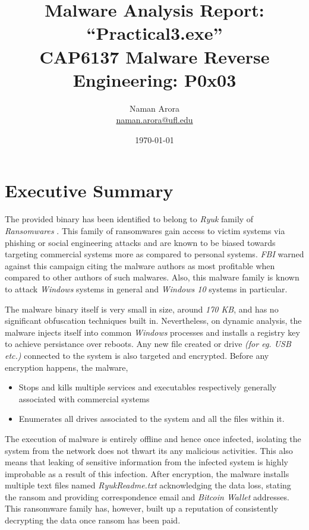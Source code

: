 \documentclass[10pt,a4paper]{article}
\begin{document}

\title{Malware Analysis Report: ``Practical3.exe''\\ \vspace{-8pt} {\large CAP6137 Malware Reverse Engineering: P0x03}}
\author{{Naman Arora \\ \vspace{-10pt}\small \href{mailto:naman.arora@ufl.edu}{naman.arora@ufl.edu}}}
\date{\today}

\maketitle
\newpage
\tableofcontents
\newpage
\section{Executive Summary}
The provided binary has been identified to belong to \textit{Ryuk} family of \textit{Ransomwares} \cite{ransomware}.
This family of ransomwares gain access to victim systems via phishing \cite{phishing} or social engineering \cite{socialEngg} attacks and are known to be biased towards targeting commercial systems more as compared to personal systems.
\textit{FBI} warned against this campaign citing the malware authors as most profitable when compared to other authors of such malwares.
Also, this malware family is known to attack \textit{Windows} systems in general and \textit{Windows 10} systems in particular.

The malware binary itself is very small in size, around \textit{170 KB}, and has no significant obfuscation techniques built in.
Nevertheless, on dynamic analysis, the malware injects itself into common \textit{Windows} processes and installs a registry key to achieve persistance over reboots.
Any new file created or drive \textit{(for eg. USB etc.)} connected to the system is also targeted and encrypted.
Before any encryption happens, the malware,
\begin{itemize}
	\item Stops and kills multiple services and executables respectively generally associated with commercial systems
	\item Enumerates all drives associated to the system and all the files within it.
\end{itemize}

The execution of malware is entirely offline and hence once infected, isolating the system from the network does not thwart its any malicious activities.
This also means that leaking of sensitive information from the infected system is highly improbable as a result of this infection.
After encryption, the malware installs multiple text files named \textit{RyukReadme.txt} acknowledging the data loss, stating the ransom and providing correspondence email and \textit{Bitcoin Wallet} addresses.
This ransomware family has, however, built up a reputation of consistently decrypting the data once ransom has been paid.
\end{document}
